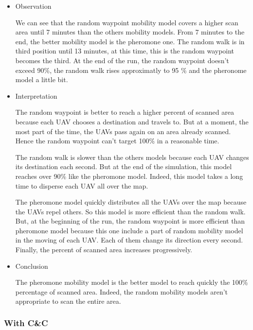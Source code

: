 \begin{itemize}

\item Observation

We can see that the random waypoint mobility model covers a higher scan area until 7 minutes than the others mobility models. From 7 minutes to the end, the better mobility model is the pheromone one. The random walk is in third position until 13 minutes, at this time, this is the random waypoint becomes the third. At the end of the run, the random waypoint doesn't exceed 90\%, the random walk rises approximatly to 95 \% and the pheronome model a little bit.

\item Interpretation

The random waypoint is better to reach a higher percent of scanned area because each UAV chooses a destination and travels to. But at a moment, the most part of the time, the UAVs pass again on an area already scanned. Hence the random waypoint can't target 100\% in a reasonable time.

The random walk is slower than the others models because each UAV changes its destination each second. But at the end of the simulation, this model reaches over 90\% like the pheromone model. Indeed, this model takes a long time to disperse each UAV all over the map.

The pheromone model quickly distributes all the UAVs over the map because the UAVs repel others. So this model is more efficient than the random walk. But, at the beginning of the run, the random waypoint is more efficient than pheromone model because this one include a part of random mobility model in the moving of each UAV. Each of them change its direction every second. Finally, the percent of scanned area increases progressively.

\item Conclusion

The pheromone mobility model is the better model to reach quickly the 100\% percentage of scanned area. Indeed, the random mobility models aren't appropriate to scan the entire area.

\end{itemize}

\subsubsection{With C\&C}

